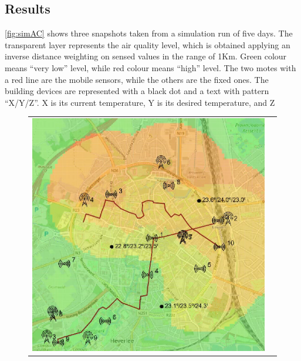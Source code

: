 \subsection*{Results}
\autoref{fig:simAC} shows three snapshots taken from a simulation run of five days.
The transparent layer represents the air quality level, which is obtained applying an inverse distance weighting on sensed values in the range of 1Km. 
Green colour means ``very low'' level, while red colour means ``high'' level.
The two motes with a red line are the mobile sensors, while the others are the fixed ones.
The building devices are represented with a black dot and a text with pattern ``X/Y/Z''.
X is its current temperature, Y is its desired temperature, and Z 
% 
\begin{figure}[h]
    \centering
    \begin{tabular}{ll}
         \includegraphics[scale=0.42]{figures/simACsnap1s.png}  &

\end{tabular}
\end{figure}
